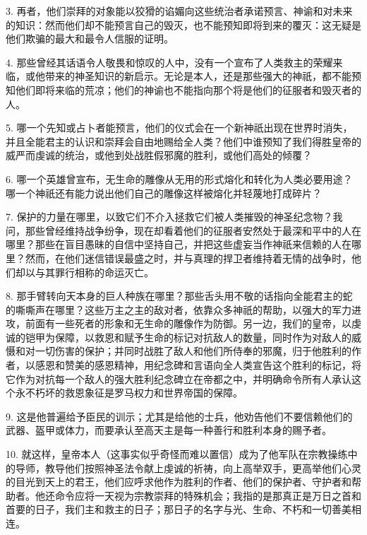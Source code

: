 3. 再者，他们崇拜的对象能以狡猾的谄媚向这些统治者承诺预言、神谕和对未来的知识：然而他们却不能预言自己的毁灭，也不能预知即将到来的覆灭：这无疑是他们欺骗的最大和最令人信服的证明。\par

4. 那些曾经其话语令人敬畏和惊叹的人中，没有一个宣布了人类救主的荣耀来临，或他带来的神圣知识的新启示。无论是本人，还是那些强大的神祇，都不能预知他们即将来临的荒凉；他们的神谕也不能指向那个将是他们的征服者和毁灭者的人。\par

5. 哪一个先知或占卜者能预言，他们的仪式会在一个新神祇出现在世界时消失，并且全能君主的认识和崇拜会自由地赐给全人类？他们中谁预知了我们得胜皇帝的威严而虔诚的统治，或他到处战胜假邪魔的胜利，或他们高处的倾覆？\par

6. 哪一个英雄曾宣布，无生命的雕像从无用的形式熔化和转化为人类必要用途？哪一个神祇还有能力说出他们自己的雕像这样被熔化并轻蔑地打成碎片？\par

7. 保护的力量在哪里，以致它们不介入拯救它们被人类摧毁的神圣纪念物？我问，那些曾经维持战争纷争，现在却看着他们的征服者安然处于最深和平中的人在哪里？那些在盲目愚昧的自信中坚持自己，并把这些虚妄当作神祇来信赖的人在哪里？然而，在他们迷信错误最盛之时，并与真理的捍卫者维持着无情的战争时，他们却以与其罪行相称的命运灭亡。\par

8. 那手臂转向天本身的巨人种族在哪里？那些舌头用不敬的话指向全能君主的蛇的嘶嘶声在哪里？这些万主之主的敌对者，依靠众多神祇的帮助，以强大的军力进攻，前面有一些死者的形象和无生命的雕像作为防御。另一边，我们的皇帝，以虔诚的铠甲为保障，以救恩和赋予生命的标记对抗敌人的数量，同时作为对敌人的威慑和对一切伤害的保护；并同时战胜了敌人和他们所侍奉的邪魔，归于他胜利的作者，以感恩和赞美的感恩精神，用纪念碑和言语向全人类宣告这个胜利的标记，将它作为对抗每一个敌人的强大胜利纪念碑立在帝都之中，并明确命令所有人承认这个永不朽坏的救恩象征是罗马权力和世界帝国的保障。\par

9. 这是他普遍给予臣民的训示；尤其是给他的士兵，他劝告他们不要信赖他们的武器、盔甲或体力，而要承认至高天主是每一种善行和胜利本身的赐予者。\par

10. 就这样，皇帝本人（这事实似乎奇怪而难以置信）成为了他军队在宗教操练中的导师，教导他们按照神圣法令献上虔诚的祈祷，向上高举双手，更高举他们心灵的目光到天上的君王，他们应呼求他作为胜利的作者、他们的保护者、守护者和帮助者。他还命令应将一天视为宗教崇拜的特殊机会；我指的是那真正是万日之首和首要的日子，我们主和救主的日子；那日子的名字与光、生命、不朽和一切善美相连。\par

